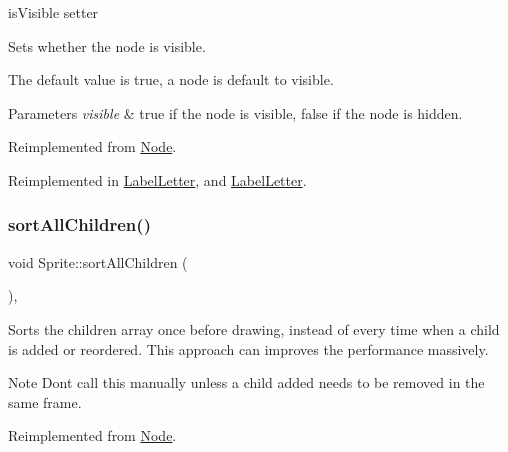 is\+Visible setter 

Sets whether the node is visible.

The default value is true, a node is default to visible.


\begin{DoxyParams}{Parameters}
{\em visible} & true if the node is visible, false if the node is hidden. \\
\hline
\end{DoxyParams}


Reimplemented from \hyperlink{classNode_ad8d9f6f838941a2a8ae18420757af158}{Node}.



Reimplemented in \hyperlink{classLabelLetter_aa46db980ecd91de0f00c7aee1f2f52f9}{Label\+Letter}, and \hyperlink{classLabelLetter_aa46db980ecd91de0f00c7aee1f2f52f9}{Label\+Letter}.

\mbox{\label{classSprite_adf75ebee22c9ff3f4d72f99c86ff365c}} 
\subsubsection{\texorpdfstring{sort\+All\+Children()}{sortAllChildren()}\hspace{0.1cm}{\footnotesize\ttfamily [1/2]}}
{\footnotesize\ttfamily void Sprite\+::sort\+All\+Children (\begin{DoxyParamCaption}{ }\end{DoxyParamCaption})\hspace{0.3cm}{\ttfamily [override]}, {\ttfamily [virtual]}}

Sorts the children array once before drawing, instead of every time when a child is added or reordered. This approach can improves the performance massively. \begin{DoxyNote}{Note}
Don\textquotesingle{}t call this manually unless a child added needs to be removed in the same frame. 
\end{DoxyNote}


Reimplemented from \hyperlink{classNode_adfaeea03013d3eae710c4d4d725bce0b}{Node}.

\mbox{\label{classSprite_ae3553d2d41b7c9fb764fc0ca1b41ef86}} 
